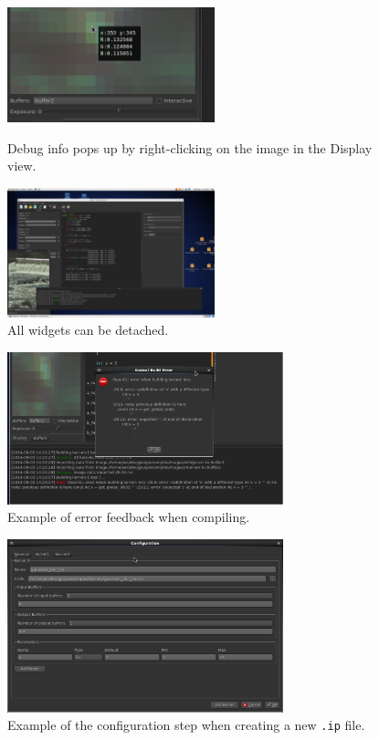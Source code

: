 \begin{center}
\begin{figure}[!tbp]
  \centering
  \begin{minipage}[b]{0.4\textwidth}
    \includegraphics[width=60mm]{img/preview.png}
    \caption{Debug info pops up by right-clicking on the image in the Display view.}
  \end{minipage}
  \hfill
  \begin{minipage}[b]{0.4\textwidth}
    \includegraphics[width=60mm]{img/detach.png}
    \caption{All widgets can be detached.}
  \end{minipage}
\end{figure}
\end{center}

\begin{figure}[ht!]
\centering
\includegraphics[width=80mm]{img/error.png}
\caption{Example of error feedback when compiling.}
\label{gpuippreview}
\end{figure}

\begin{figure}[ht!]
\centering
\includegraphics[width=80mm]{img/config.png}
\caption{Example of the configuration step when creating a new {\tt .ip} file.}
\label{gpuipconfig}
\end{figure}





